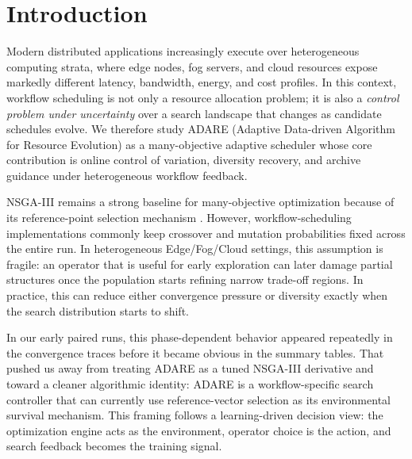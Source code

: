 \documentclass[runningheads]{llncs}
\begin{document}
\section{Introduction}
\begin{sloppypar}
Modern distributed applications increasingly execute over heterogeneous computing strata, where edge nodes, fog servers, and cloud resources expose markedly different latency, bandwidth, energy, and cost profiles. In this context, workflow scheduling is not only a resource allocation problem; it is also a \emph{control problem under uncertainty} over a search landscape that changes as candidate schedules evolve. We therefore study ADARE (Adaptive Data-driven Algorithm for Resource Evolution) as a many-objective adaptive scheduler whose core contribution is online control of variation, diversity recovery, and archive guidance under heterogeneous workflow feedback.
\end{sloppypar}

NSGA-III remains a strong baseline for many-objective optimization because of its reference-point selection mechanism \cite{deb2014nsga3}. However, workflow-scheduling implementations commonly keep crossover and mutation probabilities fixed across the entire run. In heterogeneous Edge/Fog/Cloud settings, this assumption is fragile: an operator that is useful for early exploration can later damage partial structures once the population starts refining narrow trade-off regions. In practice, this can reduce either convergence pressure or diversity exactly when the search distribution starts to shift.

In our early paired runs, this phase-dependent behavior appeared repeatedly in the convergence traces before it became obvious in the summary tables. That pushed us away from treating ADARE as a tuned NSGA-III derivative and toward a cleaner algorithmic identity: ADARE is a workflow-specific search controller that can currently use reference-vector selection as its environmental survival mechanism. This framing follows a learning-driven decision view: the optimization engine acts as the environment, operator choice is the action, and search feedback becomes the training signal.
\end{document}
